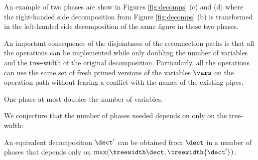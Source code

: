 {\begin{description}[leftmargin=2mm]
An example of two phases are show in Figures \ref{fig:decomps} (c) and (d) where the right-handed side decomposition from Figure \ref{fig:decomps} (b)
is transformed in the left-handed side decomposition of the same figure in these two phases.
\end{description}

An important consequence of the disjointness of the reconnection paths is that all the operations can be implemented
while only doubling the number of variables and the tree-width of the original decomposition.
Particularly, all the operations can use the same set of fresh primed versions of the variables $\vars$ on the operation path without fearing a conflict with the names of the existing pipes.
%
\begin{lemma}
\label{lemma:vars}
One phase at most doubles the number of variables.
\end{lemma}

%
%
We conjecture that the number of phases needed depends on only on the tree-width:

\begin{conjecture}
An equivalent decomposition $\dect'$ can be obtained from $\dect$ in a number of phases that depends only on $\max(\treewidth \dect,\treewidth {\dect'})$.
\end{conjecture}

%

}
